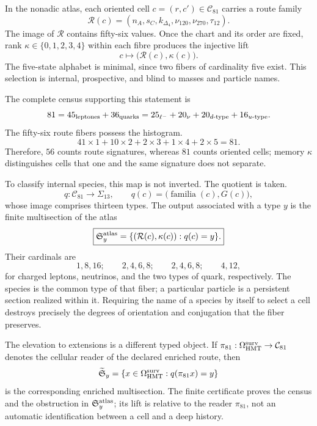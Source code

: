 In the nonadic atlas, each oriented cell \(c=(r,c')\in\mathcal C_{81}\)
carries a route family
\[
 \mathcal R(c)=
 (n_A,s_C,k_{\Delta_4},\nu_{120},\nu_{270},\tau_{12}).
\]
The image of \(\mathcal R\) contains fifty-six values. Once the
chart and its order are fixed, rank \(\kappa\in\{0,1,2,3,4\}\) within each fibre
produces the injective lift
\[
 c\longmapsto \bigl(\mathcal R(c),\kappa(c)\bigr).
\]
The five-state alphabet is minimal, since two fibers of
cardinality five exist. This selection is internal, prospective,
and blind to masses and particle names.

The complete census supporting this statement is
\[
 81=45_{\rm leptones}+36_{\rm quarks}
   =25_{\ell^-}+20_{\nu}+20_{d\text{-type}}+16_{u\text{-type}}.
\]
The fifty-six route fibers possess the histogram.
\[
 41\times1+10\times2+2\times3+1\times4+2\times5=81.
\]
Therefore, \(56\) counts route signatures, whereas \(81\) counts oriented
cells; memory \(\kappa\) distinguishes cells that one and the same signature does not
separate.

To classify internal species, this map is not inverted. The
quotient is taken.
\[
 q:\mathcal C_{81}\longrightarrow\Sigma_{13},
 \qquad
 q(c)=\bigl(\operatorname{familia}(c),G(c)\bigr),
\]
whose image comprises thirteen types. The output associated with a type \(y\) is the
finite multisection of the atlas
\[
 \boxed{
 \mathfrak S_y^{\rm atlas}=
 \{(\mathcal R(c),\kappa(c)):q(c)=y\}.}
\]
Their cardinals are
\[
 1,8,16;\qquad 2,4,6,8;\qquad 2,4,6,8;\qquad4,12,
\]
for charged leptons, neutrinos, and the two types of quark,
respectively. The species is the common type of that fiber; a particular particle
is a persistent section realized within it. Requiring the
name of a species by itself to select a cell destroys precisely the
degrees of orientation and conjugation that the fiber preserves.

The elevation to extensions is a different typed object. If
\(\pi_{81}:\Omega_{\rm HMT}^{\rm surv}\to\mathcal C_{81}\) denotes the cellular reader
of the declared enriched route, then
\[
 \widetilde{\mathfrak S}_y
 =\{x\in\Omega_{\rm HMT}^{\rm surv}:q(\pi_{81}x)=y\}
\]
is the corresponding enriched multisection. The finite certificate
proves the census and the obstruction in
\(\mathfrak S_y^{\rm atlas}\); its lift is relative to the reader
\(\pi_{81}\), not an automatic identification between a cell and a
deep history.

